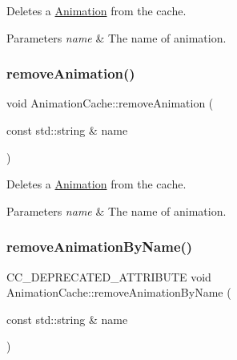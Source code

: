Deletes a \hyperlink{classAnimation}{Animation} from the cache.


\begin{DoxyParams}{Parameters}
{\em name} & The name of animation. \\
\hline
\end{DoxyParams}
\mbox{\label{classAnimationCache_a7e3f77ac879a17a8418cdb80aebb2ca7}} 
\subsubsection{\texorpdfstring{remove\+Animation()}{removeAnimation()}\hspace{0.1cm}{\footnotesize\ttfamily [2/2]}}
{\footnotesize\ttfamily void Animation\+Cache\+::remove\+Animation (\begin{DoxyParamCaption}\item[{const std\+::string \&}]{name }\end{DoxyParamCaption})}

Deletes a \hyperlink{classAnimation}{Animation} from the cache.


\begin{DoxyParams}{Parameters}
{\em name} & The name of animation. \\
\hline
\end{DoxyParams}
\mbox{\label{classAnimationCache_a67e8c52d54b5615c58c896eaa617a716}} 
\subsubsection{\texorpdfstring{remove\+Animation\+By\+Name()}{removeAnimationByName()}\hspace{0.1cm}{\footnotesize\ttfamily [1/2]}}
{\footnotesize\ttfamily C\+C\+\_\+\+D\+E\+P\+R\+E\+C\+A\+T\+E\+D\+\_\+\+A\+T\+T\+R\+I\+B\+U\+TE void Animation\+Cache\+::remove\+Animation\+By\+Name (\begin{DoxyParamCaption}\item[{const std\+::string \&}]{name }\end{DoxyParamCaption})\hspace{0.3cm}{\ttfamily [inline]}}

